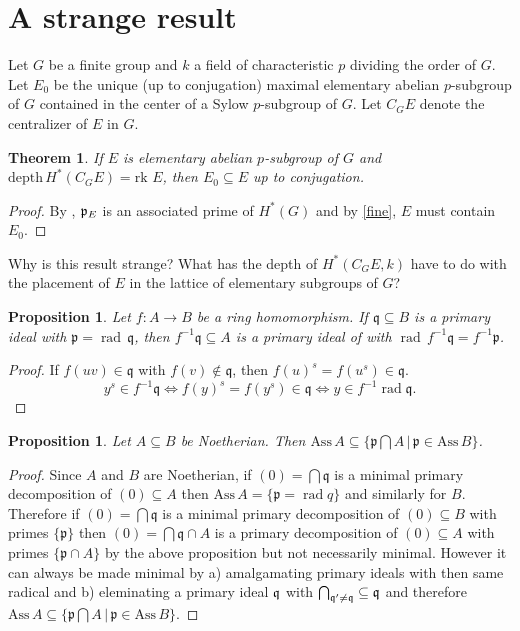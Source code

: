 \documentclass[reqno]{amsart}
\theoremstyle{plain}%
\newtheorem{prop}[thm]{Proposition}
\newtheorem*{thm*}{Theorem}
\theoremstyle{definition}
\theoremstyle{remark}
\newcommand\sub{\subseteq}
\newcommand\mf[1]{\mathfrak #1}
\newcommand{\rad}{\operatorname{rad}}
\newcommand\dph{\text{depth}\,}
\newcommand\as{\text{Ass}\,}
\newcommand\rk{\text{rk }}
\begin{document}
\section{A strange result}

Let $G$ be a finite group and $k$ a field of characteristic $p$ dividing the order of $G$.  Let $E_0$ be the unique (up to conjugation) maximal elementary abelian $p$-subgroup of $G$ contained in the center of a Sylow $p$-subgroup of $G$.  Let $C_GE$ denote the centralizer of $E$ in $G$.

\begin{thm*} If $E$ is elementary abelian $p$-subgroup of $G$ and $\dph H^*(C_GE)=\rk E$, then $E_0\sub E$ up to conjugation.\end{thm*}
\begin{proof} By \cite{O}, $\frak p_E$ is an associated prime of $H^*(G)$ and by \ref{fine}, $E$ must contain $E_0$.
\end{proof}

Why is this result strange?  What has the depth of $H^*(C_GE,k)$ have to do with the placement of $E$ in the lattice of elementary subgroups of $G$?

\begin{prop} Let $f:A\to B$ be a ring homomorphism. If $\mf q\sub B$ is a primary ideal with $\mf p=\rad\,\mf q$, then $f^{-1}\mf q\sub A$ is a primary ideal of with $\rad\,f^{-1}\mf q=f^{-1}\mf p$.
\end{prop} 
\begin{proof} If $f(uv)\in\mf q$ with $f(v)\notin\mf q$, then $f(u)^s=f(u^s)\in\mf q$. 
$$ y^s\in f^{-1}\mf q\iff f(y)^s=f(y^s)\in\mf q\iff y\in f^{-1}\rad\mf q.$$\end{proof}

\begin{prop} Let $A\sub B$ be Noetherian.  Then $\as A\sub\{\mf p\bigcap A\,\vert\, \mf p\in\as B\}$.
\end{prop}
\begin{proof}
Since $A$ and $B$ are Noetherian, if $(0)=\bigcap\mf q$ is a minimal primary decomposition of $(0)\sub A$ then $\as A=\{\mf p=\rad q\}$ and similarly for $B$.  Therefore if $(0)=\bigcap\mf q$ is a minimal primary decomposition of $(0)\sub B$ with primes $\{\mf p\}$ then $(0)= \bigcap \mf q\cap A$ is a primary decomposition of $(0)\sub A$ with primes $\{\mf p\cap A\}$ by the above proposition but not necessarily minimal. However it can always be made minimal by a) amalgamating primary ideals with then same radical and b) eleminating a primary ideal $\frak q$ with $\bigcap_{\frak q'\neq\frak q}\sub\frak q$ and therefore $\as A\sub\{\mf p\bigcap A \,\vert\, \mf p\in\as B\}$.

\end{proof}
\end{document}
